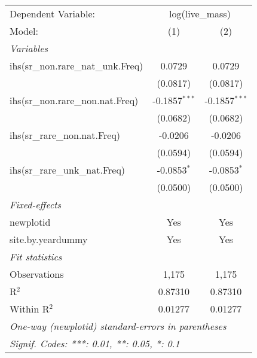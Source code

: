 \begin{tabular}{lcc}
\tabularnewline\midrule\midrule
Dependent Variable:&\multicolumn{2}{c}{log(live\_mass)}\\
Model:&(1) & (2)\\
\midrule \emph{Variables}&   &  \\
ihs(sr\_non.rare\_nat\_unk.Freq)&0.0729 & 0.0729\\
  &(0.0817) & (0.0817)\\
ihs(sr\_non.rare\_non.nat.Freq)&-0.1857$^{***}$ & -0.1857$^{***}$\\
  &(0.0682) & (0.0682)\\
ihs(sr\_rare\_non.nat.Freq)&-0.0206 & -0.0206\\
  &(0.0594) & (0.0594)\\
ihs(sr\_rare\_unk\_nat.Freq)&-0.0853$^{*}$ & -0.0853$^{*}$\\
  &(0.0500) & (0.0500)\\
\midrule \emph{Fixed-effects}&   &  \\
newplotid & Yes & Yes\\
site.by.yeardummy & Yes & Yes\\
\midrule \emph{Fit statistics}&  & \\
Observations & 1,175&1,175\\
R$^2$ & 0.87310&0.87310\\
Within R$^2$ & 0.01277&0.01277\\
\midrule\midrule\multicolumn{3}{l}{\emph{One-way (newplotid) standard-errors in parentheses}}\\
\multicolumn{3}{l}{\emph{Signif. Codes: ***: 0.01, **: 0.05, *: 0.1}}\\
\end{tabular}


